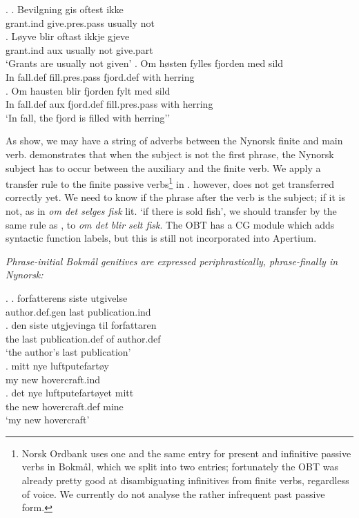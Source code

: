 \documentclass[11pt]{article}
\newcommand{\comment}[1]{\textbf{SKRIV} {\it #1}}
\renewcommand{\comment}[1]{}
\begin{document}
\setlength{\Exlabelsep}{1.0em} %
\alignSubExtrue %
\ex. \label{pass} 
\ag. Bevilgning gis oftest ikke\\
grant.{\sc ind} give.{\sc pres.pass} usually not\\
\bg. Løyve blir oftast ikkje gjeve\\
grant.{\sc ind} {\sc aux} usually not give.{\sc part} \\
`Grants are usually not given'
\cg. Om høsten fylles fjorden med sild\\
In fall.{\sc def} fill.{\sc pres.pass} fjord.{\sc def} with herring\\
\label{pass-syntax}
\dg. Om hausten blir fjorden fylt med sild\\
In fall.{\sc def} {\sc aux} fjord.{\sc def} fill.{\sc pres.pass} with herring\\ 
`In fall, the fjord is filled with herring''

As \Last[a-b] show, we may have a string of adverbs between the
Nynorsk finite and main verb. \Last[c-d] demonstrates that when the
subject is not the first phrase, the Nynorsk subject has to occur
between the auxiliary and the finite verb\comment{ (Norwegian being a
  V2 language)}. We apply a transfer rule to the finite passive
verbs\footnote{Norsk Ordbank uses one and the same entry for present
  and infinitive passive verbs in Bokmål, which we split into two
  entries; fortunately the OBT was already pretty good at
  disambiguating infinitives from finite verbs, regardless of voice.  We 
  currently do not analyse the rather infrequent past passive
  form.} in \Last[a-b]. \Last[c-d] however, does not get transferred
correctly yet. We need to know if the phrase after the verb is the
subject; if it is not, as in \emph{om det selges fisk} lit. `if there
is sold fish', we should transfer by the same rule as \Last[a-b], to
\emph{om det blir selt fisk}. The OBT has a CG module which adds
syntactic function labels, but this is still not incorporated into
Apertium. 

\emph{Phrase-initial Bokmål genitives are
  expressed periphrastically, phrase-finally in Nynorsk:}

\ex. \label{posgen}
\ag. forfatterens siste utgivelse\\
author.{\sc def.gen} last publication.{\sc ind}\\
\bg. den siste utgjevinga til forfattaren\\
the last publication.{\sc def} of author.{\sc def}\\
`the author's last publication'\\
\cg. mitt nye luftputefartøy\\
my new hovercraft.{\sc ind}\\
\dg. det nye luftputefartøyet mitt\\
the new hovercraft.{\sc def} mine\\
`my new hovercraft'
\end{document}
